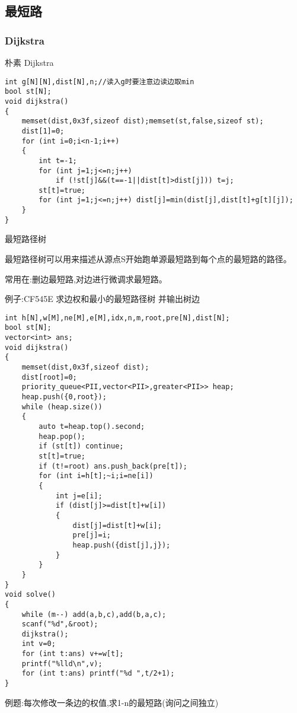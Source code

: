 \documentclass[a4paper]{ctexart}
\begin{document}
\subsection{最短路}

\subsubsection{Dijkstra}
朴素 Dijkstra
\begin{lstlisting}
int g[N][N],dist[N],n;//读入g时要注意边读边取min
bool st[N];
void dijkstra()
{
    memset(dist,0x3f,sizeof dist);memset(st,false,sizeof st);
    dist[1]=0;
    for (int i=0;i<n-1;i++)
    {
        int t=-1;
        for (int j=1;j<=n;j++)
            if (!st[j]&&(t==-1||dist[t]>dist[j])) t=j;
        st[t]=true;
        for (int j=1;j<=n;j++) dist[j]=min(dist[j],dist[t]+g[t][j]);
    }
}
\end{lstlisting}

最短路径树

最短路径树可以用来描述从源点S开始跑单源最短路到每个点的最短路的路径。

常用在:删边最短路,对边进行微调求最短路。

例子:CF545E   求边权和最小的最短路径树 并输出树边

\begin{lstlisting}
int h[N],w[M],ne[M],e[M],idx,n,m,root,pre[N],dist[N];
bool st[N];
vector<int> ans;
void dijkstra()
{
	memset(dist,0x3f,sizeof dist);
	dist[root]=0;
	priority_queue<PII,vector<PII>,greater<PII>> heap;
	heap.push({0,root});
	while (heap.size())
	{
		auto t=heap.top().second;
		heap.pop();
		if (st[t]) continue;
		st[t]=true;
		if (t!=root) ans.push_back(pre[t]);
		for (int i=h[t];~i;i=ne[i])
		{
			int j=e[i];
			if (dist[j]>=dist[t]+w[i])
			{
				dist[j]=dist[t]+w[i];
				pre[j]=i;
				heap.push({dist[j],j});
			}
		}
	}
}
void solve()
{
    while (m--) add(a,b,c),add(b,a,c);
    scanf("%d",&root);
    dijkstra();
    int v=0;
    for (int t:ans) v+=w[t];
    printf("%lld\n",v);
    for (int t:ans) printf("%d ",t/2+1);
}
\end{lstlisting}

例题:每次修改一条边的权值,求1-n的最短路(询问之间独立)
\end{document}
